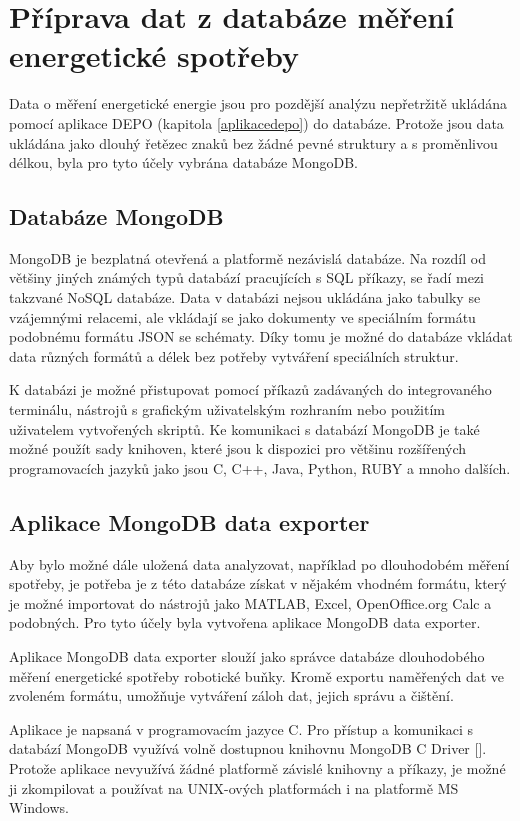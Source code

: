 \chapter{Příprava dat z databáze měření energetické spotřeby}

Data o měření energetické energie jsou pro pozdější analýzu nepřetržitě ukládána pomocí aplikace DEPO (kapitola \ref{aplikacedepo}) do databáze. Protože jsou data ukládána jako dlouhý řetězec znaků bez žádné pevné struktury a s proměnlivou délkou, byla pro tyto účely vybrána databáze MongoDB. 

\section{Databáze MongoDB}

MongoDB je bezplatná otevřená a platformě nezávislá databáze. Na rozdíl od většiny jiných známých typů databází pracujících s SQL příkazy, se řadí mezi takzvané NoSQL databáze. Data v databázi nejsou ukládána jako tabulky se vzájemnými relacemi, ale vkládají se jako dokumenty ve speciálním formátu podobnému formátu JSON se schématy. Díky tomu je možné do databáze vkládat data různých formátů a délek bez potřeby vytváření speciálních struktur. 

K databázi je možné přistupovat pomocí příkazů zadávaných do integrovaného terminálu, nástrojů s grafickým uživatelským rozhraním nebo použitím uživatelem vytvořených skriptů. Ke komunikaci s databází MongoDB je také možné použít sady knihoven, které jsou k dispozici pro většinu rozšířených programovacích jazyků jako jsou C, C++, Java, Python, RUBY a mnoho dalších.     

\section{Aplikace MongoDB data exporter}

Aby bylo možné dále uložená data analyzovat, například po dlouhodobém měření spotřeby, je potřeba je z této databáze získat v nějakém vhodném formátu, který je možné importovat do nástrojů jako MATLAB, Excel, OpenOffice.org Calc a podobných. Pro tyto účely byla vytvořena aplikace MongoDB data exporter. 

Aplikace MongoDB data exporter slouží jako správce databáze dlouhodobého měření energetické spotřeby robotické buňky. Kromě exportu naměřených dat ve zvoleném formátu, umožňuje vytváření záloh dat, jejich správu a čištění. 

Aplikace je napsaná v programovacím jazyce C. Pro přístup a komunikaci s databází MongoDB využívá volně dostupnou knihovnu MongoDB C Driver [\cite{}]. Protože aplikace nevyužívá žádné platformě závislé knihovny a příkazy, je možné ji zkompilovat a používat na UNIX-ových platformách i na platformě MS Windows.  

